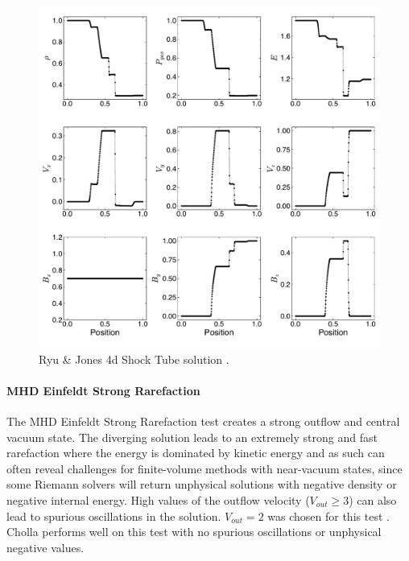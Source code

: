 \documentclass[modern, linenumbers]{aastex631}
\newcommand*{\img}[1]{%
    \raisebox{-.3\baselineskip}{%
        \texttt{[image: \#1]}%
    }%
}
\begin{document}
\begin{figure}[ht!]
    \includegraphics[width=\linewidth]{rj4d.pdf}
    \caption{Ryu \& Jones 4d Shock Tube solution \citep{ryu_jones_1995}.
    \href{https://github.com/bcaddy/caddy-et-al-2023/blob/4c9c5ef905902e54e50943d0a261bd5b08342225/python/shock-tubes.py}{\img{github.png}}}
    \label{fig:rj-4d}
\end{figure}

\paragraph{MHD Einfeldt Strong Rarefaction}

The MHD Einfeldt Strong Rarefaction test \citep{einfeldt_1991} creates a strong outflow and central vacuum state. The diverging solution leads to an extremely strong and fast rarefaction where the energy is dominated by kinetic energy and as such can often reveal challenges for finite-volume methods with near-vacuum states, since some Riemann solvers will return unphysical solutions with negative density or negative internal energy. High values of the outflow velocity ($V_{out}\ge3$) can also lead to spurious oscillations in the solution. $V_{out} = 2$ was chosen for this test \citep{charm_2011}. Cholla performs well on this test with no spurious oscillations or unphysical negative values.
\end{document}
